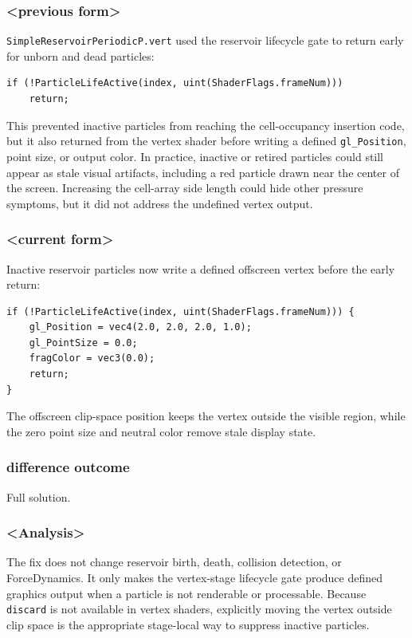 \subsubsection{<previous form>}

\texttt{SimpleReservoirPeriodicP.vert} used the reservoir lifecycle gate to
return early for unborn and dead particles:

\begin{verbatim}
if (!ParticleLifeActive(index, uint(ShaderFlags.frameNum)))
    return;
\end{verbatim}

This prevented inactive particles from reaching the cell-occupancy insertion
code, but it also returned from the vertex shader before writing a defined
\texttt{gl\_Position}, point size, or output color.  In practice, inactive or
retired particles could still appear as stale visual artifacts, including a
red particle drawn near the center of the screen.  Increasing the cell-array
side length could hide other pressure symptoms, but it did not address the
undefined vertex output.

\subsubsection{<current form>}

Inactive reservoir particles now write a defined offscreen vertex before the
early return:

\begin{verbatim}
if (!ParticleLifeActive(index, uint(ShaderFlags.frameNum))) {
    gl_Position = vec4(2.0, 2.0, 2.0, 1.0);
    gl_PointSize = 0.0;
    fragColor = vec3(0.0);
    return;
}
\end{verbatim}

The offscreen clip-space position keeps the vertex outside the visible region,
while the zero point size and neutral color remove stale display state.

\subsubsection{difference outcome}

Full solution.

\subsubsection{<Analysis>}

The fix does not change reservoir birth, death, collision detection, or
ForceDynamics.  It only makes the vertex-stage lifecycle gate produce defined
graphics output when a particle is not renderable or processable.  Because
\texttt{discard} is not available in vertex shaders, explicitly moving the
vertex outside clip space is the appropriate stage-local way to suppress
inactive particles.

